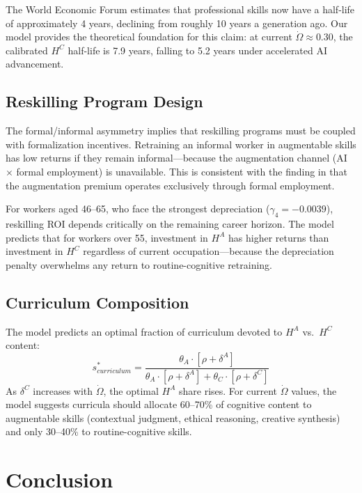 \documentclass[11pt,a4paper]{article}
\theoremstyle{definition}
\begin{document}
The World Economic Forum \citep{wef2025future} estimates that professional skills now have a half-life of approximately 4 years, declining from roughly 10 years a generation ago. Our model provides the theoretical foundation for this claim: at current $\dot{\Omega} \approx 0.30$, the calibrated $H^C$ half-life is 7.9 years, falling to 5.2 years under accelerated AI advancement.

\subsection{Reskilling Program Design}

The formal/informal asymmetry implies that reskilling programs must be coupled with formalization incentives. Retraining an informal worker in augmentable skills has low returns if they remain informal---because the augmentation channel (AI $\times$ formal employment) is unavailable. This is consistent with the finding in \citet{espinal2026ahc} that the augmentation premium operates exclusively through formal employment.

For workers aged 46--65, who face the strongest depreciation ($\gamma_4 = -0.0039$), reskilling ROI depends critically on the remaining career horizon. The model predicts that for workers over 55, investment in $H^A$ has higher returns than investment in $H^C$ regardless of current occupation---because the depreciation penalty overwhelms any return to routine-cognitive retraining.

\subsection{Curriculum Composition}

The model predicts an optimal fraction of curriculum devoted to $H^A$ vs.\ $H^C$ content:
\begin{equation}
s^*_{curriculum} = \frac{\theta_A \cdot [\rho + \delta^A]}{\theta_A \cdot [\rho + \delta^A] + \theta_C \cdot [\rho + \delta^C]}
\end{equation}
As $\delta^C$ increases with $\dot{\Omega}$, the optimal $H^A$ share rises. For current $\dot{\Omega}$ values, the model suggests curricula should allocate 60--70\% of cognitive content to augmentable skills (contextual judgment, ethical reasoning, creative synthesis) and only 30--40\% to routine-cognitive skills.


\section{Conclusion}
\label{sec:conclusion}
\end{document}
